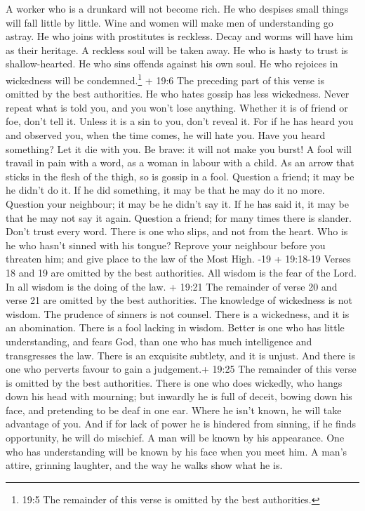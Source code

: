  A worker who is a drunkard will not become rich. He who
despises small things will fall little by little.  Wine and
women will make men of understanding go astray. He who joins with
prostitutes is reckless.  Decay and worms will have him as
their heritage. A reckless soul will be taken away.  He who
is hasty to trust is shallow-hearted. He who sins offends against his
own soul.  He who rejoices in wickedness will be
condemned.\footnote{19:5 The remainder of this verse is omitted by the
  best authorities.}  + 19:6 The preceding part of this
verse is omitted by the best authorities. He who hates gossip has less
wickedness.  Never repeat what is told you, and you won't
lose anything.  Whether it is of friend or foe, don't tell
it. Unless it is a sin to you, don't reveal it.  For if he
has heard you and observed you, when the time comes, he will hate you.
 Have you heard something? Let it die with you. Be brave:
it will not make you burst!  A fool will travail in pain
with a word, as a woman in labour with a child.  As an
arrow that sticks in the flesh of the thigh, so is gossip in a fool.
 Question a friend; it may be he didn't do it. If he did
something, it may be that he may do it no more.  Question
your neighbour; it may be he didn't say it. If he has said it, it may be
that he may not say it again.  Question a friend; for many
times there is slander. Don't trust every word.  There is
one who slips, and not from the heart. Who is he who hasn't sinned with
his tongue?  Reprove your neighbour before you threaten
him; and give place to the law of the Most High. -19 +
19:18-19 Verses 18 and 19 are omitted by the best authorities.
 All wisdom is the fear of the Lord. In all wisdom is the
doing of the law.  + 19:21 The remainder of verse 20 and
verse 21 are omitted by the best authorities.  The
knowledge of wickedness is not wisdom. The prudence of sinners is not
counsel.  There is a wickedness, and it is an abomination.
There is a fool lacking in wisdom.  Better is one who has
little understanding, and fears God, than one who has much intelligence
and transgresses the law.  There is an exquisite subtlety,
and it is unjust. And there is one who perverts favour to gain a
judgement.+ 19:25 The remainder of this verse is omitted by the best
authorities.  There is one who does wickedly, who hangs
down his head with mourning; but inwardly he is full of deceit,
 bowing down his face, and pretending to be deaf in one
ear. Where he isn't known, he will take advantage of you. 
And if for lack of power he is hindered from sinning, if he finds
opportunity, he will do mischief.  A man will be known by
his appearance. One who has understanding will be known by his face when
you meet him.  A man's attire, grinning laughter, and the
way he walks show what he is.

